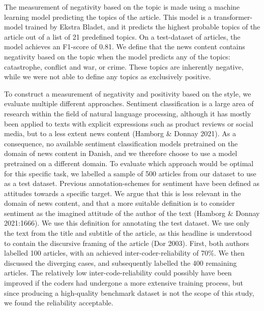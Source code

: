 \documentclass[
]{article}
\begin{document}
The measurement of negativity based on the topic is made using a machine
learning model predicting the topics of the article. This model is a
transformer-model trained by Ekstra Bladet, and it predicts the highest
probable topics of the article out of a list of 21 predefined topics. On
a test-dataset of articles, the model achieves an F1-score of 0.81. We
define that the news content contains negativity based on the topic when
the model predicts any of the topics: catastrophe, conflict and war, or
crime. These topics are inherently negative, while we were not able to
define any topics as exclusively positive.

To construct a measurement of negativity and positivity based on the
style, we evaluate multiple different approaches. Sentiment
classification is a large area of research within the field of natural
language processing, although it has mostly been applied to texts with
explicit expressions such as product reviews or social media, but to a
less extent news content (Hamborg \& Donnay 2021). As a consequence, no
available sentiment classification models pretrained on the domain of
news content in Danish, and we therefore choose to use a model
pretrained on a different domain. To evaluate which approach would be
optimal for this specific task, we labelled a sample of 500 articles
from our dataset to use as a test dataset. Previous annotation-schemes
for sentiment have been defined as attitudes towards a specific target.
We argue that this is less relevant in the domain of news content, and
that a more suitable definition is to consider sentiment as the imagined
attitude of the author of the text (Hamborg \& Donnay 2021:1666). We use
this definition for annotating the test dataset. We use only the text
from the title and subtitle of the article, as this headline is
understood to contain the discursive framing of the article (Dor 2003).
First, both authors labelled 100 articles, with an achieved
inter-coder-reliability of 70\%. We then discussed the diverging cases,
and subsequently labelled the 400 remaining articles. The relatively low
inter-code-reliability could possibly have been improved if the coders
had undergone a more extensive training process, but since producing a
high-quality benchmark dataset is not the scope of this study, we found
the reliability acceptable.
\end{document}
